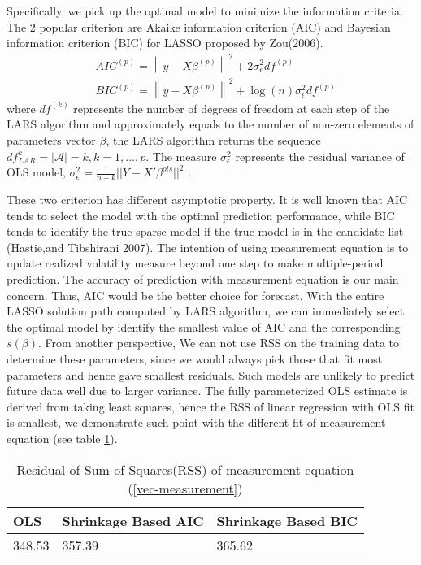\documentclass[titlepage,11pt]{article}
\begin{document}
 Specifically, we pick up the optimal model to minimize the information criteria. The 2 popular criterion are Akaike information criterion (AIC) and  Bayesian information criterion (BIC) for LASSO proposed by Zou(2006). 
 \begin{equation}
\label{AIC}
\begin{aligned}
& AIC^{(p)} = \left \| y-X\beta^ {(p)} \right \|^2 + 2\sigma_\epsilon ^2 df^{(p)}  \\
& BIC^{(p)} = \left \| y-X\beta^ {(p)} \right \|^2 + \log(n) \sigma_\epsilon ^2 df^{(p)}
\end{aligned}
\end{equation}
where $df^{(k)}$ represents the number of degrees of freedom at each step of the LARS algorithm and approximately equals to the number of non-zero elements of parameters vector $\beta$, the LARS algorithm returns the sequence $df_{LAR}^{k}=|\mathcal{A}|=k, k=1,...,p$. The measure $\sigma_\epsilon^2$ represents the residual variance of OLS model, $\sigma_\epsilon^2=\frac{1}{n-k}||Y-X'\beta^{ols}||^2$ .





These two criterion has different asymptotic property. It is well known that AIC tends to select the model with the optimal prediction performance, while BIC tends to identify the true sparse model if the true model is in the candidate list (Hastie,and Tibshirani  2007). The intention of using measurement equation is to update realized volatility measure beyond one step to make multiple-period prediction. The accuracy of prediction with measurement equation is our main concern. Thus, AIC would be the better choice for forecast. With the entire LASSO solution path computed by LARS algorithm, we can immediately select the optimal model by identify the smallest value of AIC and the corresponding $s(\beta)$.  
From another perspective, We can not use RSS on the training data to determine these parameters, since we would always pick those that fit most parameters and hence gave smallest residuals. Such models are unlikely to predict future data well due to larger variance. The fully parameterized OLS estimate is derived from taking least squares, hence the RSS of linear regression with OLS fit is smallest, we demonstrate such point with the different fit of measurement equation (see table \ref{RSS}). 
\begin{table} [!htbp]
	
	
	\begin{tabular}{|p{4cm}|p{4cm}|p{4cm}|}
		
		\hline OLS  & Shrinkage Based AIC  & Shrinkage Based BIC \\ 
		\hline 348.53  & 357.39 & 365.62 \\ 
		\hline 
	\end{tabular} 
	\captionsetup{justification=raggedright,singlelinecheck=false}
	\caption{ Residual of Sum-of-Squares(RSS) of measurement equation (\ref{vec-measurement})}
	\label{RSS}
\end{table}
\end{document}
